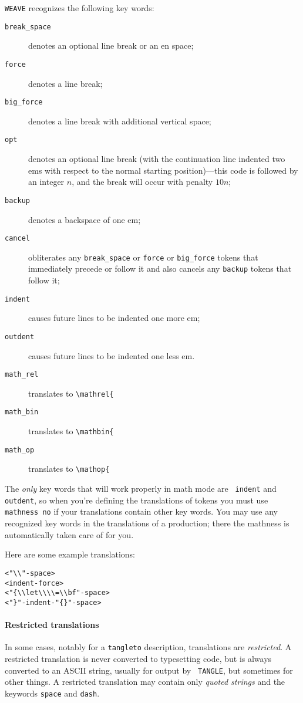 \begin{itemize}
{\tt WEAVE} recognizes the following key words:
\begin{description}
\item[\tt break\_space] denotes an optional line break or an en space;
\item[\tt force] denotes a line break;
\item[\tt big\_force] denotes a line break with additional vertical space;
\item[\tt opt] denotes an optional line break (with the continuation
line indented two ems with respect to the normal starting position)---this
code is followed by an integer $n$, and the break will occur with penalty
$10n$;
\item[\tt backup] denotes a backspace of one em;
\item[\tt cancel] obliterates any {\tt break\_space} or {\tt force} or
{\tt big\_force} 
tokens that immediately precede or follow it and also cancels any
{\tt backup} tokens that follow it;
\item[\tt indent] causes future lines to be indented one more em;
\item[\tt outdent] causes future lines to be indented one less em.
\item[\tt math\_rel] translates to \verb+\mathrel{+
\item[\tt math\_bin]translates to \verb+\mathbin{+
\item[\tt math\_op] translates to \verb+\mathop{+
\end{description}
The {\em only} key words that will work properly in math mode are {\tt
indent} and {\tt outdent}, so when you're defining the translations of
tokens you must use {\tt mathness~no} if your translations contain
other key words.
You may use any recognized key words in the translations of a
production; there the mathness is automatically taken care of for you.
\end{itemize}

Here are some example translations:
\begin{verbatim}
<"\\"-space>
<indent-force>
<"{\\let\\\\=\\bf"-space>
<"}"-indent-"{}"-space>
\end{verbatim}

\paragraph{Restricted translations}
In some cases, notably for a {\tt tangleto} description, translations
are {\em restricted}.
A restricted translation is never converted to typesetting code,
but is always converted to an ASCII string, usually for output by {\tt
TANGLE}, but sometimes for other things.
A restricted translation may contain only {\em quoted strings} and the
keywords {\tt space} and {\tt dash}.


